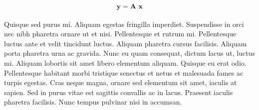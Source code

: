 \begin{equation}
\mathbf{y} = \mathbf{A} \ \mathbf{x}
\end{equation}

Quisque sed purus mi. Aliquam egestas fringilla imperdiet. Suspendisse in orci nec nibh pharetra ornare ut et nisi. Pellentesque et rutrum mi. Pellentesque luctus ante et velit tincidunt luctus. Aliquam pharetra cursus facilisis. Aliquam porta pharetra urna ac gravida. Nunc eu quam consequat, dictum lacus ut, luctus mi. Aliquam lobortis sit amet libero elementum aliquam. Quisque eu erat odio. Pellentesque habitant morbi tristique senectus et netus et malesuada fames ac turpis egestas. Cras neque magna, ornare sed elementum sit amet, iaculis at sapien. Sed in purus vitae est sagittis convallis ac in lacus. Praesent iaculis pharetra facilisis. Nunc tempus pulvinar nisi in accumsan.
